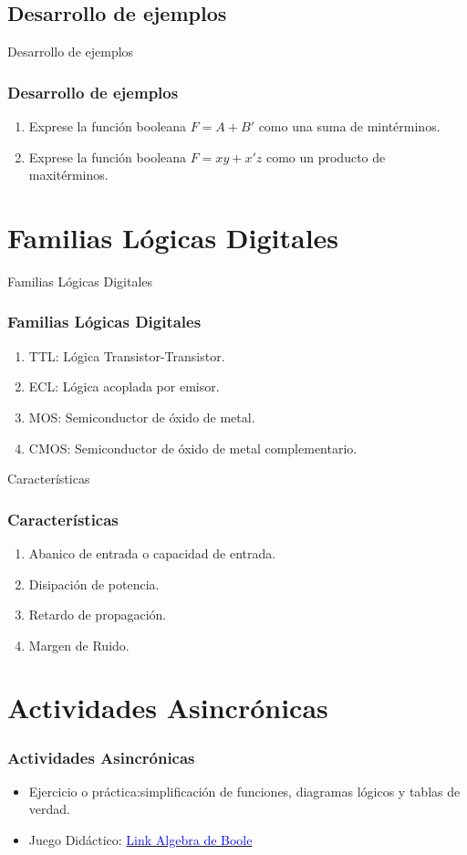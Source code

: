 \documentclass[11pt]{beamer}
\begin{document}
\subsection{Desarrollo de ejemplos}
\begin{frame}{Desarrollo de ejemplos}
\frametitle{Desarrollo de ejemplos}
	\begin{enumerate}
		\item Exprese la funci\'on booleana $F=A+B'$ como una suma de mint\'erminos.
		\item Exprese la funci\'on booleana $F=xy+x'z$ como un producto de maxit\'erminos.
	\end{enumerate}
\end{frame}

\section{Familias L\'ogicas Digitales}
\begin{frame}{Familias L\'ogicas Digitales}
\frametitle{Familias L\'ogicas Digitales}
	\begin{enumerate}
		\item TTL: L\'ogica Transistor-Transistor.
		\item ECL: L\'ogica acoplada por emisor.
		\item MOS: Semiconductor de \'oxido de metal.
		\item CMOS: Semiconductor de \'oxido de metal complementario.
	\end{enumerate}
\end{frame}
\begin{frame}{Caracter\'isticas}
\frametitle{Caracter\'isticas}
	\begin{enumerate}
		\item Abanico de entrada o capacidad de entrada.
		\item Disipaci\'on de potencia.
		\item Retardo de propagaci\'on.
		\item Margen de Ruido.
	\end{enumerate}
\end{frame}

\section{Actividades Asincr\'onicas}
\begin{frame}
\frametitle{Actividades Asincr\'onicas}
	\begin{itemize}
		\item Ejercicio o pr\'actica:simplificación de funciones, diagramas l\'ogicos y tablas de verdad.
		\item Juego Did\'actico: \href{https://www.cerebriti.com/juegos-de-tecnologia/algebra-de-boole}{\textcolor{blue}{Link Algebra de Boole}}
	\end{itemize}
\end{frame}
\end{document}
